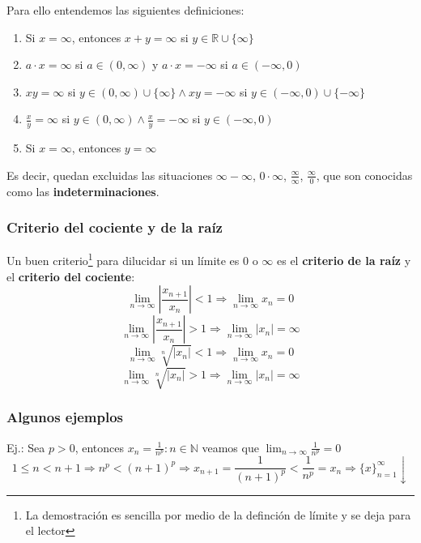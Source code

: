 \documentclass[10pt,a4paper,openright]{book}
\begin{document}
Para ello entendemos las siguientes definiciones:
\begin{enumerate}
\item Si $x=\infty$, entonces $x+y=\infty$ si $y\in \mathbb R\cup \{\infty\}$

\item $a\cdot x=\infty$ si $a\in (0,\infty)$ y $a\cdot x=-\infty $ si $a\in (-\infty, 0)$

\item $xy=\infty$ si $y\in (0,\infty)\cup\{\infty\} \wedge xy=-\infty$ si $y\in (-\infty,0)\cup\{-\infty\} $

\item $\frac{x}{y}=\infty $ si $y\in (0,\infty) \wedge \frac{x}{y}=-\infty $ si $y\in (-\infty,0) $

\item Si $x=\infty$, entonces $y=\infty$

\end{enumerate}

Es decir, quedan excluidas las situaciones $\infty -\infty$, $0\cdot \infty$, $\frac{\infty}{\infty}$, $\frac{\infty}{0}$,  que son conocidas como las \textbf{indeterminaciones}.

\subsubsection*{Criterio del cociente y de la raíz}
Un buen criterio\footnote{La demostración es sencilla por medio de la definción de límite y se deja para el lector} para dilucidar si un límite es 0 o $\infty$ es el \textbf{criterio de la raíz} y el \textbf{criterio del cociente}:
$$\lim_{n\rightarrow \infty}\left|\frac{x_{n+1}}{x_n}\right|<1\Rightarrow \lim_{n\rightarrow \infty} x_n=0$$
$$\lim_{n\rightarrow \infty}\left|\frac{x_{n+1}}{x_n}\right|>1\Rightarrow \lim_{n\rightarrow \infty} |x_n|=\infty$$
$$\lim_{n\rightarrow \infty}\sqrt[n]{|x_n|}<1\Rightarrow \lim_{n\rightarrow \infty} x_n=0$$
$$\lim_{n\rightarrow \infty}\sqrt[n]{|x_n|}>1\Rightarrow \lim_{n\rightarrow \infty} |x_n|=\infty$$


\subsubsection*{Algunos ejemplos}
Ej.: Sea $p>0$, entonces $x_n=\frac{1}{n^p}: n\in \mathbb N$ veamos que $\lim_{n\rightarrow \infty} \frac{1}{n^p}=0$
$$1\leq n<n+1\Rightarrow n^p< (n+1)^p\Rightarrow x_{n+1}=\frac{1}{(n+1)^p}<\frac{1}{n^p}=x_n\Rightarrow \{x\}_{n=1}^\infty \downarrow$$
\end{document}
